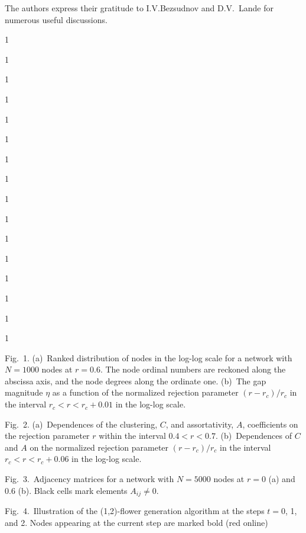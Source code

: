\documentclass[aps,preprint]{revtex4}%
\begin{document}
The authors express their gratitude to I.V.Bezsudnov and D.V.~Lande for
numerous useful discussions.

\newpage

\begin{thebibliography}{99}                                                                                               %


1

1

1

1

1

1

1

1

1

1

1

1

1

1

1

1
\end{thebibliography}

\newpage

Fig.~1. (a)~Ranked distribution of nodes in the log-log scale for a network
with $N=1000$ nodes at $r=0.6$. The node ordinal numbers are reckoned along
the abscissa axis, and the node degrees along the ordinate one. (b)~The gap
magnitude $\eta$ as a function of the normalized rejection parameter
$(r-r_{c})/r_{c}$ in the interval $r_{c}<r<r_{c}+0.01$ in the log-log scale.

Fig.~2. (a)~Dependences of the clustering, $C$, and assortativity, $A$,
coefficients on the rejection parameter $r$ within the interval $0.4<r<0.7$.
(b)~Dependences of $C$ and $A$ on the normalized rejection parameter
$(r-r_{c})/r_{c}$ in the interval $r_{c}<r<r_{c}+0.06$ in the log-log scale.

Fig.~3.~Adjacency matrices for a network with $N=5000$ nodes at $r=0$ (a) and
0.6 (b). Black cells mark elements $A_{ij}\neq0$.

Fig.~4.~Illustration of the (1,2)-flower generation algorithm at the steps
$t=0$, 1, and 2. Nodes appearing at the current step are marked bold (red online)
\end{document}

